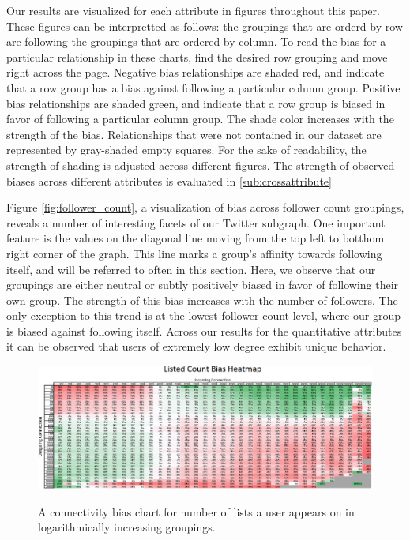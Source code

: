Our results are visualized for each attribute in figures throughout this paper.  These figures can be interpretted as follows: the groupings that are orderd by row are following the groupings that are ordered by column.  To read the bias for a particular relationship in these charts, find the desired row grouping and move right across the page.  Negative bias relationships are shaded red, and indicate that a row group has a bias against following a particular column group.  Positive bias relationships are shaded green, and indicate that a row group is biased in favor of following a particular column group.  The shade color increases with the strength of the bias.  Relationships that were not contained in our dataset are represented by gray-shaded empty squares.  For the sake of readability, the strength of shading is adjusted across different figures.  The strength of observed biases across different attributes is evaluated in \ref{sub:crossattribute}

Figure \ref{fig:follower_count}, a visualization of bias across follower count groupings, reveals a number of interesting facets of our Twitter subgraph.  One important feature is the values on the diagonal line moving from the top left to botthom right corner of the graph.  This line marks a group's affinity towards following itself, and will be referred to often in this section.  Here, we observe that our groupings are either neutral or subtly positively biased in favor of following their own group.  The strength of this bias increases with the number of followers.  The only exception to this trend is at the lowest follower count level, where our group is biased against following itself.  Across our results for the quantitative attributes it can be observed that users of extremely low degree exhibit unique behavior.

\begin{figure}[t]
 \centering
 \includegraphics[bb=0 0 1026 380, scale=.3]{./images/Bates-Final/listedcount.png}
 \label{fig:listed_count}
 \caption{A connectivity bias chart for number of lists a user appears on in logarithmically increasing groupings.}
\end{figure}


